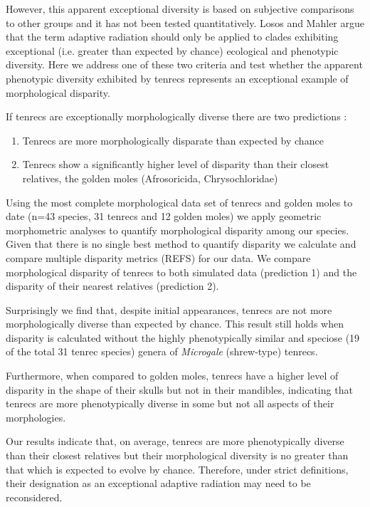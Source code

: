 \documentclass[12pt,a4paper]{article}
\begin{document}
However, this apparent exceptional diversity is based on subjective comparisons to other groups and it has not been tested quantitatively. Losos and Mahler \citeyearpar{Losos2010a} argue that the term adaptive radiation should only be applied to clades exhibiting exceptional (i.e. greater than expected by chance) ecological and phenotypic diversity.
Here we address one of these two criteria and test whether the apparent phenotypic diversity exhibited by tenrecs represents an exceptional example of morphological disparity. 

If tenrecs are exceptionally morphologically diverse there are two predictions \citep{Losos2010a}:   
\begin{enumerate}
\item Tenrecs are more morphologically disparate than expected by chance
\item Tenrecs show a significantly higher level of disparity than their closest relatives, the golden moles (Afrosoricida, Chrysochloridae)
\end{enumerate}

Using the most complete morphological data set of tenrecs and golden moles to date (n=43 species, 31 tenrecs and 12 golden moles) we apply geometric morphometric analyses \citep{Rohlf1993, Zelditch2012} to quantify morphological disparity among our species. Given that there is no single best method to quantify disparity \citep{Ciampaglio2001} we calculate and compare multiple disparity metrics (REFS) for our data. We compare morphological disparity of tenrecs to both simulated data (prediction 1) and the disparity of their nearest relatives (prediction 2).

Surprisingly we find that, despite initial appearances, tenrecs are not more morphologically diverse than expected by chance. This result still holds when disparity is calculated without the highly phenotypically similar and speciose (19 of the total 31 tenrec species) genera of \textit{Microgale} (shrew-type) tenrecs.

Furthermore, when compared to golden moles, tenrecs have a higher level of disparity in the shape of their skulls but not in their mandibles, indicating that tenrecs are more phenotypically diverse in some but not all aspects of their morphologies.

Our results indicate that, on average, tenrecs are more phenotypically diverse than their closest relatives but their morphological diversity is no greater than that which is expected to evolve by chance. Therefore, under strict definitions, their designation as an exceptional adaptive radiation may need to be reconsidered. 
\end{document}
